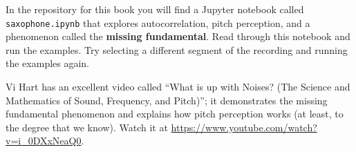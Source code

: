 \begin{exercise}
	In the repository for this book you will find a Jupyter notebook
	called \verb"saxophone.ipynb" that explores autocorrelation,
	pitch perception, and a phenomenon called the {\bf missing fundamental}.
	Read through this notebook and run the examples.  Try selecting
	a different segment of the recording and running the examples again.
	
	Vi Hart has an excellent video called ``What is up with Noises? (The
	Science and Mathematics of Sound, Frequency, and Pitch)''; it
	demonstrates the missing fundamental phenomenon and explains how pitch
	perception works (at least, to the degree that we know).  Watch it at
	\url{https://www.youtube.com/watch?v=i_0DXxNeaQ0}.
	
\end{exercise}

